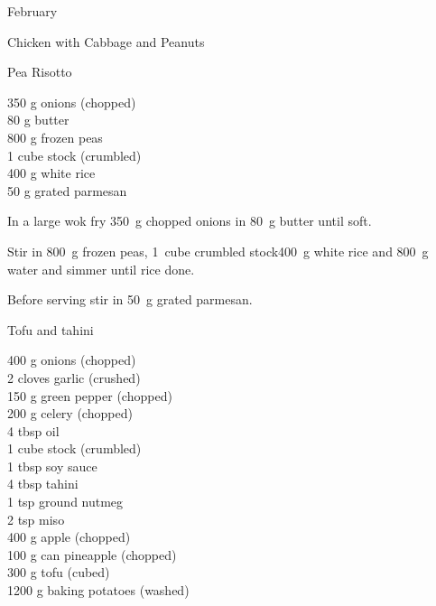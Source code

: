 \begin{menu}{February}
\begin{recipe}{2}{Chicken with Cabbage and Peanuts}
\begin{instructions}
    \end{instructions}
    \end{recipe}%
  
    \begin{recipe}{2}{Pea Risotto}%
    
		\begin{ingredients}
		350 g onions (chopped) \\
	80 g butter  \\
	800 g frozen peas  \\
	1 cube stock (crumbled) \\
	400 g white rice  \\
	50 g grated parmesan  \\
	
		\end{ingredients}
	
    \begin{instructions}
    \item 
        In a large wok fry
        350~g chopped onions
        in
        80~g  butter
        until soft.
      \item 
        Stir in
        800~g  frozen peas,
        1~cube crumbled stock400~g  white rice
        and
        800~g  water
        and simmer until rice done.
      \item 
        Before serving stir in
        50~g  grated parmesan.
      
    \end{instructions}
    \end{recipe}%
  
    \begin{recipe}{2}{Tofu and tahini}%
    
		\begin{ingredients}
		400 g onions (chopped) \\
	2 cloves garlic (crushed) \\
	150 g green pepper (chopped) \\
	200 g celery (chopped) \\
	4 tbsp oil  \\
	1 cube stock (crumbled) \\
	1 tbsp soy sauce  \\
	4 tbsp tahini  \\
	1 tsp ground nutmeg  \\
	2 tsp miso  \\
	400 g apple (chopped) \\
	100 g can pineapple (chopped) \\
	300 g tofu (cubed) \\
	1200 g baking potatoes (washed) \\
	

\end{ingredients}
\end{recipe}
\end{menu}
